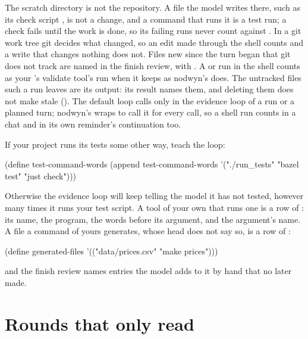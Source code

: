 The scratch directory is not the repository. A file the model writes there,
such as its check script , is not a change, and a
command that runs it is a test run; a check fails until the work is done, so
its failing runs never count against . In a git work
tree git decides what changed, so an edit made through the shell counts and
a write that changes nothing does not. Files new since the turn began that
git does not track are named in the finish review, with
. A  or
 run in the shell counts as your
's validate tool's run when it keeps
 as nodwyn's does. The untracked files such a run
leaves are its output: its result names them, and deleting them does not
make  stale (). The default
loop calls  only in the evidence loop of a run or a
planned turn; nodwyn's  wraps  to call it for
every call, so a shell run counts in a chat and in its own reminder's
continuation too.

\begin{tip}
If your project runs its tests some other way, teach the loop:
\begin{scm}
(define test-command-words
  (append test-command-words '("./run_tests" "bazel test" "just check")))
\end{scm}
Otherwise the evidence loop will keep telling the model it has not tested,
however many times it runs your test script. A tool of your own that runs
one is a row of : its name, the program, the words
before its argument, and the argument's name. A file a command of yours
generates, whose head does not say so, is a row of :
\begin{scm}
(define generated-files '(("data/prices.csv" "make prices")))
\end{scm}
and the finish review names entries the model adds to it by hand that no
later  made.
\end{tip}

\section{Rounds that only read}

